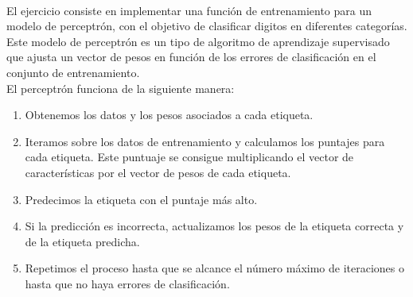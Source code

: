 \documentclass{report}
\begin{document}
        \paragraph*{}{
          El ejercicio consiste en implementar una función de entrenamiento para un modelo de perceptrón, con el objetivo de clasificar digitos en diferentes categorías.
          Este modelo de perceptrón es un tipo de algoritmo de aprendizaje supervisado que ajusta un vector de pesos en función de los errores de clasificación en el conjunto de entrenamiento.\\

          El perceptrón funciona de la siguiente manera:
          \begin{enumerate}
            \item Obtenemos los datos y los pesos asociados a cada etiqueta.
            \item Iteramos sobre los datos de entrenamiento y calculamos los puntajes para cada etiqueta. Este puntuaje se consigue multiplicando el vector de características por el vector de pesos de cada etiqueta.
            \item Predecimos la etiqueta con el puntaje más alto.
            \item Si la predicción es incorrecta, actualizamos los pesos de la etiqueta correcta y de la etiqueta predicha.
            \item Repetimos el proceso hasta que se alcance el número máximo de iteraciones o hasta que no haya errores de clasificación.
          \end{enumerate}
        }
\end{document}
